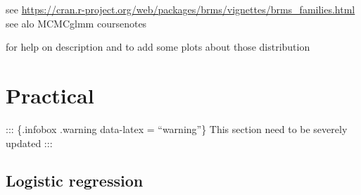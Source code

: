 \documentclass[
  12pt,
]{book}
\newenvironment{Shaded}{\begin{snugshade}}{\end{snugshade}}
\newcommand{\DecValTok}[1]{\textcolor[rgb]{0.00,0.00,0.81}{#1}}
\newcommand{\KeywordTok}[1]{\textcolor[rgb]{0.13,0.29,0.53}{\textbf{#1}}}
\newcommand{\NormalTok}[1]{#1}
\newcommand{\OperatorTok}[1]{\textcolor[rgb]{0.81,0.36,0.00}{\textbf{#1}}}
\newcommand{\StringTok}[1]{\textcolor[rgb]{0.31,0.60,0.02}{#1}}
\begin{document}
see \url{https://cran.r-project.org/web/packages/brms/vignettes/brms_families.html}
see alo MCMCglmm coursenotes

for help on description and to add some plots about those distribution

\hypertarget{practical-1}{%
\section{Practical}\label{practical-1}}

::: \{.infobox .warning data-latex = ``warning''\}
This section need to be severely updated
:::

\hypertarget{logistic-regression}{%
\subsection{Logistic regression}\label{logistic-regression}}

\begin{Shaded}
\end{Shaded}
\end{document}
